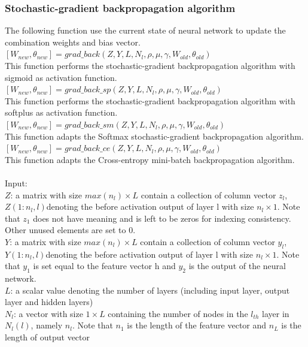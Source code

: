 \documentclass[journal,a4paper,onecolumn,11pt]{IEEEtran}
\begin{document}
\subsubsection{Stochastic-gradient backpropagation algorithm}
The following function use the current state of neural network to update the combination weights and bias vector. \\
$[W_{new},\theta_{new}] = grad\_back(Z,Y,L,N_{l},\rho,\mu,\gamma,W_{old},\theta_{old})$\\
This function performs the stochastic-gradient backpropagation algorithm with sigmoid as activation function.\\
$[W_{new},\theta_{new}] = grad\_back\_sp(Z,Y,L,N_{l},\rho,\mu,\gamma,W_{old},\theta_{old})$\\
This function performs the stochastic-gradient backpropagation algorithm with softplus as activation function.\\
$[W_{new},\theta_{new}] = grad\_back\_sm(Z,Y,L,N_{l},\rho,\mu,\gamma,W_{old},\theta_{old})$\\
This function adapts the Softmax stochastic-gradient backpropagation algorithm.\\
$[W_{new},\theta_{new}] = grad\_back\_ce(Z,Y,L,N_{l},\rho,\mu,\gamma,W_{old},\theta_{old})$\\
This function adapts the Cross-entropy mini-batch backpropagation algorithm.\\\\
Input:\\
$Z$: a matrix with size $max(n_{l}) \times L$ contain a collection of column vector $z_{l}$, $Z(1:n_{l},l)$denoting the before activation output of layer l with size $n_{l} \times 1$. Note that $z_1$ does not have meaning and is left to be zeros for indexing consistency. Other unused elements are set to 0. \\
$Y$: a matrix with size $max(n_{l}) \times L$ contain a collection of column vector $y_{l}$, $Y(1:n_{l},l)$denoting the before activation output of layer l with size $n_{l} \times 1$. Note that $y_1$ is set equal to the feature vector h and $y_2$ is the output of the neural network.  \\
$L$:  a scalar value denoting the number of layers (including input layer, output layer and hidden layers)\\
$N_{l}$: a vector with size  $1\times L$ containing the number of nodes in the $l_{th}$ layer in $N_{l}(l)$, namely  $n_{l}$. Note that $n_1$ is the length of the feature vector and $n_L$ is the length of output vector \\
\end{document}

